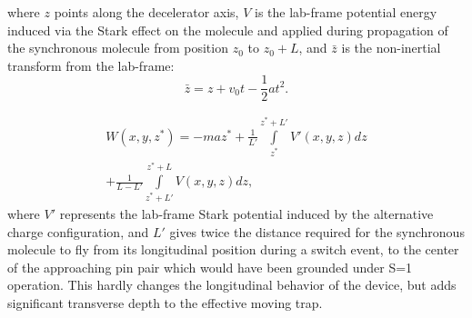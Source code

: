 \documentclass[%
 reprint,
 amsmath,amssymb,
 aps,
prl,
]{revtex4-1}
\begin{document}
where $z$ points along the decelerator axis, $V$ is the lab-frame potential energy induced via the Stark effect on the molecule and applied during propagation of the synchronous molecule from position $z_0$ to $z_0+L$, and $\bar{z}$ is the non-inertial transform from the lab-frame: 
\begin{equation}
\bar{z} = z + v_0 t - \frac{1}{2}a t^2.
\end{equation}

\begin{multline}
W(x,y,z^*) = - maz^* + 
\frac{1}{L'}\!\!\int\limits_{z^*}^{z^*+L'}\!\!V'(x,y,z) dz \\
+\frac{1}{L-L'}\!\!\int\limits_{z^*+L'}^{z^*+L}\!\!V(x,y,z) dz,\hspace{2cm}
\end{multline}
where $V'$ represents the lab-frame Stark potential induced by the alternative charge configuration, and $L'$ gives twice the distance required for the synchronous molecule to fly from its longitudinal position during a switch event, to the center of the approaching pin pair which would have been grounded under S=1 operation. This hardly changes the longitudinal behavior of the device, but adds significant transverse depth to the effective moving trap.
\end{document}
